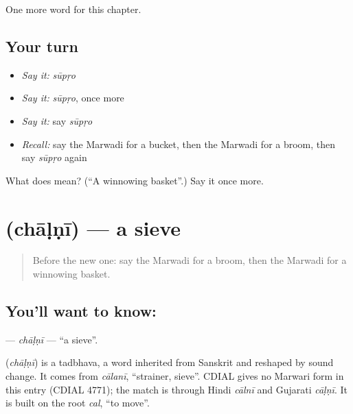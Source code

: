\begin{grammarlens}[title={What you've built}]
One more word for this chapter.
\end{grammarlens}

\subsection*{Your turn}
\begin{itemize}
\raggedright
  \item \emph{Say it:} \emph{sūpṛo}
  \item \emph{Say it:} \emph{sūpṛo}, once more
  \item \emph{Say it:} say \emph{sūpṛo}
  \item \emph{Recall:} say the Marwadi for a bucket, then the Marwadi for a broom, then say \emph{sūpṛo} again
\end{itemize}

\begin{tcolorbox}[breakable,colback=teal!4,colframe=teal!35!black,title={Before you move on}]
What does  mean? (\textquotedblleft{}A winnowing basket\textquotedblright{}.) Say it once more.
\end{tcolorbox}
\section[\texorpdfstring{\mw{चाळणी} (chāḷṇī)}{चाळणी (chāḷṇī)}]{ (chāḷṇī) — a sieve}

\label{lesson:MW-C120-chalni}



\begin{quote}
Before the new one: say the Marwadi for a broom, then the Marwadi for a winnowing basket.
\end{quote}

\subsection*{You'll want to know: }
\textbf{} — \emph{chāḷṇī} — \textquotedblleft{}a sieve\textquotedblright{}.

\begin{cousinweb}
\textbf{} (\emph{chāḷṇī}) is a tadbhava, a word inherited from Sanskrit and reshaped by sound change. It comes from \emph{cālanī}, \textquotedblleft{}strainer, sieve\textquotedblright{}. CDIAL gives no Marwari form in this entry (CDIAL 4771); the match is through Hindi \emph{cālnī} and Gujarati \emph{cāḷṇī}. It is built on the root \emph{cal}, \textquotedblleft{}to move\textquotedblright{}.
\end{cousinweb}

